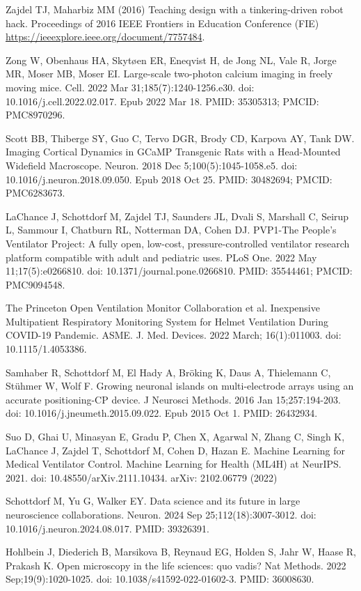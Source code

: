 \documentclass[10pt,letterpaper]{article}
\begin{document}
\begin{thebibliography}{10}
Zajdel TJ, Maharbiz MM (2016) Teaching design with a tinkering-driven robot hack. Proceedings of 2016 IEEE Frontiers in Education Conference (FIE) \url{https://ieeexplore.ieee.org/document/7757484}.

Zong W, Obenhaus HA, Skytøen ER, Eneqvist H, de Jong NL, Vale R, Jorge MR, Moser MB, Moser EI. Large-scale two-photon calcium imaging in freely moving mice. Cell. 2022 Mar 31;185(7):1240-1256.e30. doi: 10.1016/j.cell.2022.02.017. Epub 2022 Mar 18. PMID: 35305313; PMCID: PMC8970296.

Scott BB, Thiberge SY, Guo C, Tervo DGR, Brody CD, Karpova AY, Tank DW. Imaging Cortical Dynamics in GCaMP Transgenic Rats with a Head-Mounted Widefield Macroscope. Neuron. 2018 Dec 5;100(5):1045-1058.e5. doi: 10.1016/j.neuron.2018.09.050. Epub 2018 Oct 25. PMID: 30482694; PMCID: PMC6283673.

LaChance J, Schottdorf M, Zajdel TJ, Saunders JL, Dvali S, Marshall C, Seirup L, Sammour I, Chatburn RL, Notterman DA, Cohen DJ. PVP1-The People's Ventilator Project: A fully open, low-cost, pressure-controlled ventilator research platform compatible with adult and pediatric uses. PLoS One. 2022 May 11;17(5):e0266810. doi: 10.1371/journal.pone.0266810. PMID: 35544461; PMCID: PMC9094548.

The Princeton Open Ventilation Monitor Collaboration et al. Inexpensive Multipatient Respiratory Monitoring System for Helmet Ventilation During COVID-19 Pandemic. ASME. J. Med. Devices. 2022 March; 16(1):011003. doi: 10.1115/1.4053386.

Samhaber R, Schottdorf M, El Hady A, Bröking K, Daus A, Thielemann C, Stühmer W, Wolf F. Growing neuronal islands on multi-electrode arrays using an accurate positioning-\textmu CP device. J Neurosci Methods. 2016 Jan 15;257:194-203. doi: 10.1016/j.jneumeth.2015.09.022. Epub 2015 Oct 1. PMID: 26432934.

Suo D, Ghai U, Minasyan E, Gradu P, Chen X, Agarwal N, Zhang C, Singh K, LaChance J, Zajdel T, Schottdorf M, Cohen D, Hazan E. Machine Learning for Medical Ventilator Control. Machine Learning for Health (ML4H) at NeurIPS. 2021. doi: 10.48550/arXiv.2111.10434. arXiv: 2102.06779 (2022)

Schottdorf M, Yu G, Walker EY. Data science and its future in large neuroscience collaborations. Neuron. 2024 Sep 25;112(18):3007-3012. doi: 10.1016/j.neuron.2024.08.017. PMID: 39326391.

Hohlbein J, Diederich B, Marsikova B, Reynaud EG, Holden S, Jahr W, Haase R, Prakash K. Open microscopy in the life sciences: quo vadis? Nat Methods. 2022 Sep;19(9):1020-1025. doi: 10.1038/s41592-022-01602-3. PMID: 36008630.

\end{thebibliography}
\end{document}
